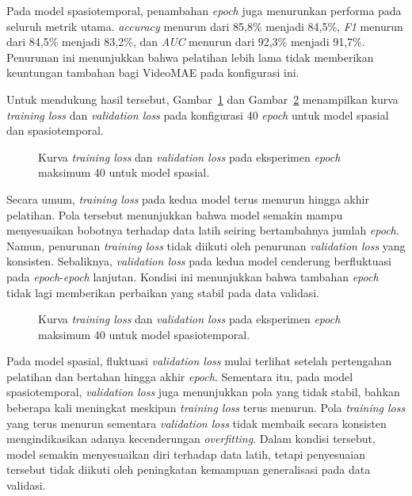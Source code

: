 Pada model spasiotemporal, penambahan \textit{epoch} juga menurunkan performa pada seluruh metrik utama. \textit{accuracy} menurun dari 85,8\% menjadi 84,5\%, \textit{F1} menurun dari 84,5\% menjadi 83,2\%, dan \textit{AUC} menurun dari 92,3\% menjadi 91,7\%. Penurunan ini menunjukkan bahwa pelatihan lebih lama tidak memberikan keuntungan tambahan bagi VideoMAE pada konfigurasi ini.

Untuk mendukung hasil tersebut, Gambar~\ref{fig:4.ablation-epoch-loss-spatial} dan Gambar~\ref{fig:4.ablation-epoch-loss-spatiotemporal} menampilkan kurva \textit{training loss} dan \textit{validation loss} pada konfigurasi 40 \textit{epoch} untuk model spasial dan spasiotemporal.

\begin{figure}[htbp]
\centering
{}
\caption{Kurva \textit{training loss} dan \textit{validation loss} pada eksperimen \textit{epoch} maksimum 40 untuk model spasial.}
\label{fig:4.ablation-epoch-loss-spatial}
\end{figure}

Secara umum, \textit{training loss} pada kedua model terus menurun hingga akhir pelatihan. Pola tersebut menunjukkan bahwa model semakin mampu menyesuaikan bobotnya terhadap data latih seiring bertambahnya jumlah \textit{epoch}. Namun, penurunan \textit{training loss} tidak diikuti oleh penurunan \textit{validation loss} yang konsisten. Sebaliknya, \textit{validation loss} pada kedua model cenderung berfluktuasi pada \textit{epoch}-\textit{epoch} lanjutan. Kondisi ini menunjukkan bahwa tambahan \textit{epoch} tidak lagi memberikan perbaikan yang stabil pada data validasi.

\begin{figure}[htbp]
\centering
{}
\caption{Kurva \textit{training loss} dan \textit{validation loss} pada eksperimen \textit{epoch} maksimum 40 untuk model spasiotemporal.}
\label{fig:4.ablation-epoch-loss-spatiotemporal}
\end{figure}

Pada model spasial, fluktuasi \textit{validation loss} mulai terlihat setelah pertengahan pelatihan dan bertahan hingga akhir \textit{epoch}. Sementara itu, pada model spasiotemporal, \textit{validation loss} juga menunjukkan pola yang tidak stabil, bahkan beberapa kali meningkat meskipun \textit{training loss} terus menurun. Pola \textit{training loss} yang terus menurun sementara \textit{validation loss} tidak membaik secara konsisten mengindikasikan adanya kecenderungan \textit{overfitting}. Dalam kondisi tersebut, model semakin menyesuaikan diri terhadap data latih, tetapi penyesuaian tersebut tidak diikuti oleh peningkatan kemampuan generalisasi pada data validasi.

